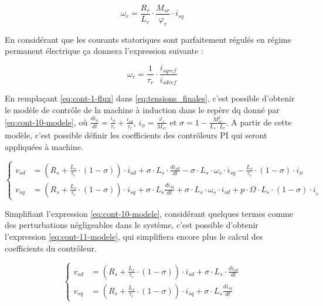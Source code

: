 \begin{equation}
    \omega_r = \frac{R_r}{L_r} \cdot \frac{M_{sr}}{\varphi_r} \cdot i_{sq}
    \label{eq:cont-8-omegar}
\end{equation}

En considérant que les courants statoriques sont parfaitement régulés en régime permanent électrique ça donnera l'expression suivante :


\begin{equation}
    \omega_r = \frac{1}{\tau_r} \cdot \frac{i_{sqref}}{i_{sdref}}
    \label{eq:cont-9-omegar}
\end{equation}

En remplaçant \ref{eq:cont-1-flux} dans \ref{eq:tensions_finales}, c'est possible d'obtenir le modèle de contrôle de la machine à induction dans le repère dq donné par \ref{eq:cont-10-modele}, où $\frac{di_\phi}{dt} = \frac{i_\phi}{\tau_r} + \frac{i_{sd}}{\tau_r}$, $i_\phi = \frac{\varphi_r}{M_{sr}}$ et $\sigma = 1 - \frac{M_{sr}^2}{L_s \cdot L_r}$. A partir de cette modèle, c'est possible définir les coefficients des contrôleurs PI qui seront appliquées à machine.

\begin{equation}
    \left\{
    \begin{aligned}
    v_{sd} &= \left( R_s + \frac{L_s}{\tau_r} \cdot (1 - \sigma)  \right) \cdot i_{sd} + \sigma\cdot L_{s} \cdot \frac{di_{sd}}{dt} - \sigma \cdot L_s \cdot \omega_s \cdot i_{sq} - \frac{L_s}{\tau_r} \cdot (1- \sigma) \cdot i_{\phi} \\
    v_{sq} &= \left( R_s + \frac{L_s}{\tau_r} \cdot (1 - \sigma) \right) \cdot i_{sq} + \sigma \cdot L_s \frac{di_{sq}}{dt} + \sigma \cdot L_s \cdot \omega_s \cdot i_{sd} + p \cdot \Omega \cdot L_s \cdot (1 - \sigma) \cdot i__{\phi}
    \end{aligned}
    \right.
    \label{eq:cont-10-modele}
\end{equation}

Simplifiant l'expression \ref{eq:cont-10-modele}, considérant quelques termes comme des perturbations négligeables dans le système, c'est possible d'obtenir l'expression \ref{eq:cont-11-modele}, qui simplifiera encore plus le calcul des coefficients du contrôleur.

\begin{equation}
    \left\{
    \begin{aligned}
    v_{sd} &= \left( R_s + \frac{L_s}{\tau_r} \cdot (1 - \sigma)  \right) \cdot i_{sd} + \sigma\cdot L_{s} \cdot \frac{di_{sd}}{dt}  \\
    v_{sq} &= \left( R_s + \frac{L_s}{\tau_r} \cdot (1 - \sigma) \right) \cdot i_{sq} + \sigma \cdot L_s \frac{di_{sq}}{dt} 
    \end{aligned}
    \right.
    \label{eq:cont-11-modele}
\end{equation}


